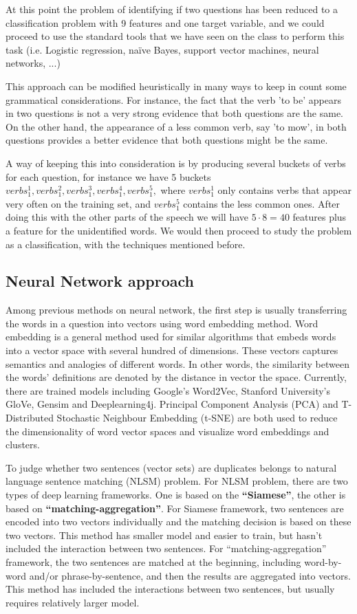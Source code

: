 \documentclass[11pt]{article}
\begin{document}
At this point the problem of identifying if two questions has been reduced to a classification problem with 9 features and one target variable, and we could proceed to use the standard tools that we have seen on the class to perform this task (i.e. Logistic regression, na\"ive Bayes, support vector machines, neural networks, ...)

This approach can be modified heuristically in many ways to keep in count some grammatical considerations. For instance, the fact that the verb 'to be' appears in two questions is not a very strong evidence that both questions are the same. On the other hand, the appearance of a less common verb, say 'to mow', in both questions provides a better evidence that both questions might be the same. 

A way of keeping this into consideration is by producing several buckets of verbs for each question, for instance we have 5 buckets $verbs_1^1, verbs_1^2, verbs_1^3, verbs_1^4, verbs_1^5,$ where $verbs_1^1$ only contains verbs that appear very often on the training set, and $verbs_1^5$ contains the less common ones. After doing this with the other parts of the speech we will have $5 \cdot 8 = 40$ features plus a feature for the unidentified words. We would then proceed to study the problem as a classification, with the techniques mentioned before.

\subsection{Neural Network approach} 
Among previous methods on neural network, the first step is usually transferring the words in a question into vectors using word embedding method. Word embedding is a general method used for similar algorithms that embeds words into a vector space with several hundred of dimensions. These vectors captures semantics and analogies of different words. In other words, the similarity between the words' definitions are denoted by the distance in vector the space. Currently, there are trained models including Google’s Word2Vec, Stanford University’s GloVe, Gensim and Deeplearning4j.  Principal Component Analysis (PCA) and T-Distributed Stochastic Neighbour Embedding (t-SNE) are both used to reduce the dimensionality of word vector spaces and visualize word embeddings and clusters.

To judge whether two sentences (vector sets) are duplicates belongs to natural language sentence matching (NLSM) problem. For NLSM problem, there are two types of deep learning frameworks. One is based on the \textbf{“Siamese”}, the other is based on \textbf{“matching-aggregation”}. For Siamese framework, two sentences are encoded into two vectors individually and the matching decision is based on these two vectors. This method has smaller model and easier to train, but hasn’t included the interaction between two sentences. For “matching-aggregation” framework, the two sentences are matched at the beginning, including word-by-word and/or phrase-by-sentence, and then the results are aggregated into vectors. This method has included the interactions between two sentences, but usually requires relatively larger model.
\end{document}
